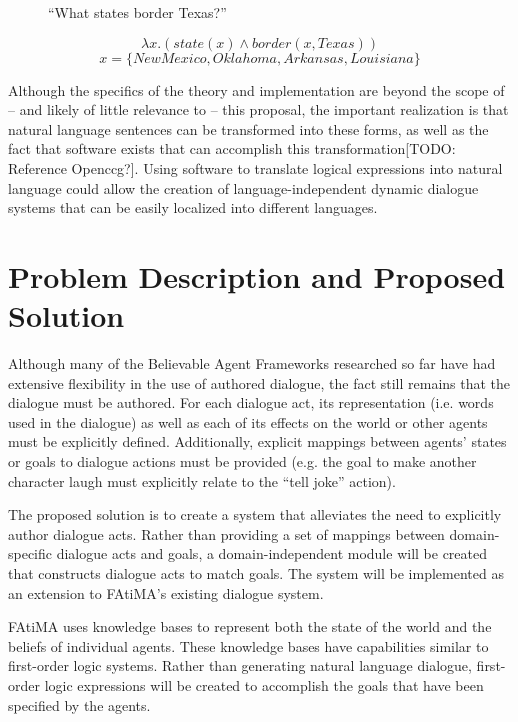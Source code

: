 \documentclass{article}
\begin{document}
\begin{figure}[h!]
\begin{center}
{
\center ``What states border Texas?''}

\[
 \lambda x.(state(x) \wedge  border(x,Texas))
\]
\[
 x = \{NewMexico, Oklahoma, Arkansas, Louisiana\}
\]

\end{center}
\end{figure}

Although the specifics of the theory and implementation are beyond the
scope of -- and likely of little relevance to -- this proposal, the
important realization is that natural language sentences can be
transformed into these forms, as well as the fact that software exists
that can accomplish this transformation[TODO: Reference Openccg?].
Using software to translate logical expressions into natural language
could allow the creation of language-independent dynamic dialogue
systems that can be easily localized into different languages.


\section{Problem Description and Proposed Solution}

Although many of the Believable Agent Frameworks researched so far
have had extensive flexibility in the use of authored dialogue, the
fact still remains that the dialogue must be authored.  For each
dialogue act, its representation (i.e. words used in the dialogue) as well as
each of its effects on the world or other agents must be explicitly
defined.  Additionally, explicit mappings between agents' states or
goals to dialogue actions must be provided (e.g. the goal to make
another character laugh must explicitly relate to the ``tell joke''
action).

The proposed solution is to create a system that alleviates the need
to explicitly author dialogue acts.  Rather than providing a set of
mappings between domain-specific dialogue acts and goals, a
domain-independent module will be created that constructs dialogue
acts to match goals.  The system will be implemented as an extension
to FAtiMA's existing dialogue system.

FAtiMA uses knowledge bases to represent both the state of the world
and the beliefs of individual agents.  These knowledge bases have
capabilities similar to first-order logic systems.  Rather than
generating natural language dialogue, first-order logic expressions
will be created to accomplish the goals that have been specified by
the agents.
\end{document}

